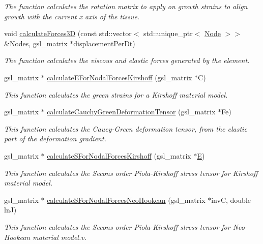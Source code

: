 \begin{DoxyCompactItemize}
\begin{DoxyCompactList}\small\item\em The function calculates the rotation matrix to apply on growth strains to align growth with the current x axis of the tissue. \end{DoxyCompactList}\item 
void \hyperlink{classShapeBase_a1afbb15d92215f337090262753eb24ab}{calculate\+Forces3\+D} (const std\+::vector$<$ std\+::unique\+\_\+ptr$<$ \hyperlink{classNode}{Node} $>$$>$ \&Nodes, gsl\+\_\+matrix $\ast$displacement\+Per\+Dt)
\begin{DoxyCompactList}\small\item\em The function calculates the viscous and elastic forces generated by the element. \end{DoxyCompactList}\item 
gsl\+\_\+matrix $\ast$ \hyperlink{classShapeBase_a347fb2687678294a252a12820842cb0d}{calculate\+E\+For\+Nodal\+Forces\+Kirshoff} (gsl\+\_\+matrix $\ast$C)
\begin{DoxyCompactList}\small\item\em This function calculates the green strains for a Kirshoff material model. \end{DoxyCompactList}\item 
gsl\+\_\+matrix $\ast$ \hyperlink{classShapeBase_ae09cb91359e10677889c3f59c3f5d70a}{calculate\+Cauchy\+Green\+Deformation\+Tensor} (gsl\+\_\+matrix $\ast$Fe)
\begin{DoxyCompactList}\small\item\em This function calculates the Caucy-\/\+Green deformation tensor, from the elastic part of the deformation gradient. \end{DoxyCompactList}\item 
gsl\+\_\+matrix $\ast$ \hyperlink{classShapeBase_a9c79b3bced80eac8af18a0a81d3898ab}{calculate\+S\+For\+Nodal\+Forces\+Kirshoff} (gsl\+\_\+matrix $\ast$\hyperlink{classShapeBase_a6c1a3a0173841d6072a5268978463ff2}{E})
\begin{DoxyCompactList}\small\item\em This function calculates the Secons order Piola-\/\+Kirshoff stress tensor for Kirshoff material model. \end{DoxyCompactList}\item 
gsl\+\_\+matrix $\ast$ \hyperlink{classShapeBase_a697f24754441df216b4245e7eb467b13}{calculate\+S\+For\+Nodal\+Forces\+Neo\+Hookean} (gsl\+\_\+matrix $\ast$inv\+C, double ln\+J)
\begin{DoxyCompactList}\small\item\em This function calculates the Secons order Piola-\/\+Kirshoff stress tensor for Neo-\/\+Hookean material model.\+v. \end{DoxyCompactList}\item 
$$
\end{DoxyCompactItemize}

